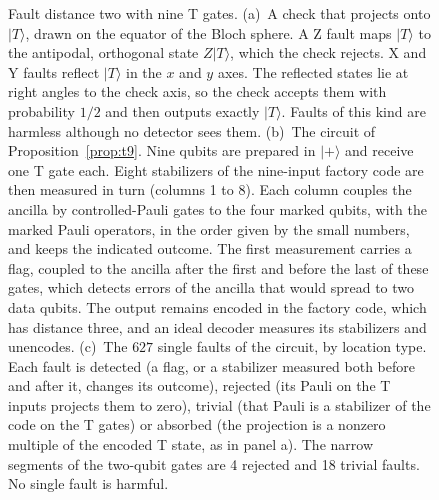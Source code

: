 \documentclass[aps,prl,reprint,twocolumn,amsmath,amssymb,floatfix,nofootinbib,superscriptaddress]{revtex4-2}
\theoremstyle{definition}
\theoremstyle{remark}
\begin{document}
\begin{figure}[h]
\centering

\caption{Fault distance two with nine T gates. (a)~A check that projects onto $|T\rangle$, drawn on the equator of the Bloch sphere. A Z fault maps $|T\rangle$ to the antipodal, orthogonal state $Z|T\rangle$, which the check rejects. X and Y faults reflect $|T\rangle$ in the $x$ and $y$ axes. The reflected states lie at right angles to the check axis, so the check accepts them with probability $1/2$ and then outputs exactly $|T\rangle$. Faults of this kind are harmless although no detector sees them. (b)~The circuit of Proposition~\ref{prop:t9}. Nine qubits are prepared in $|{+}\rangle$ and receive one T gate each. Eight stabilizers of the nine-input factory code are then measured in turn (columns 1 to 8). Each column couples the ancilla by controlled-Pauli gates to the four marked qubits, with the marked Pauli operators, in the order given by the small numbers, and keeps the indicated outcome. The first measurement carries a flag, coupled to the ancilla after the first and before the last of these gates, which detects errors of the ancilla that would spread to two data qubits. The output remains encoded in the factory code, which has distance three, and an ideal decoder measures its stabilizers and unencodes. (c)~The $627$ single faults of the circuit, by location type. Each fault is detected (a flag, or a stabilizer measured both before and after it, changes its outcome), rejected (its Pauli on the T inputs projects them to zero), trivial (that Pauli is a stabilizer of the code on the T gates) or absorbed (the projection is a nonzero multiple of the encoded T state, as in panel a). The narrow segments of the two-qubit gates are 4 rejected and 18 trivial faults. No single fault is harmful.}
\label{fig:small}
\end{figure}
\end{document}
